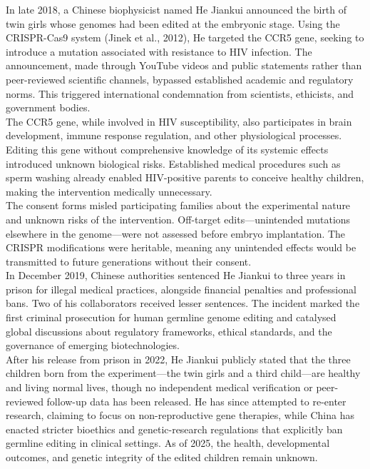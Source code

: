 \newpage
\vspace*{\fill}

\begin{shadedstory}

In late 2018, a Chinese biophysicist named He Jiankui announced the birth of twin girls whose genomes had been edited at the embryonic stage. Using the CRISPR-Cas9 system (Jinek et al., 2012), He targeted the CCR5 gene, seeking to introduce a mutation associated with resistance to HIV infection. The announcement, made through YouTube videos and public statements rather than peer-reviewed scientific channels, bypassed established academic and regulatory norms. This triggered international condemnation from scientists, ethicists, and government bodies.\\

The CCR5 gene, while involved in HIV susceptibility, also participates in brain development, immune response regulation, and other physiological processes. Editing this gene without comprehensive knowledge of its systemic effects introduced unknown biological risks. Established medical procedures such as sperm washing already enabled HIV-positive parents to conceive healthy children, making the intervention medically unnecessary.\\

 The consent forms misled participating families about the experimental nature and unknown risks of the intervention. Off-target edits—unintended mutations elsewhere in the genome—were not assessed before embryo implantation. The CRISPR modifications were heritable, meaning any unintended effects would be transmitted to future generations without their consent.\\

In December 2019, Chinese authorities sentenced He Jiankui to three years in prison for \QSOpen{}illegal medical practices,\QSClose{} alongside financial penalties and professional bans. Two of his collaborators received lesser sentences. The incident marked the first criminal prosecution for human germline genome editing and catalysed global discussions about regulatory frameworks, ethical standards, and the governance of emerging biotechnologies.\\

After his release from prison in 2022, He Jiankui publicly stated that the three children born from the experiment—the twin girls and a third child—are \QENOpen{}healthy and living normal lives,\QENClose{} though no independent medical verification or peer-reviewed follow-up data has been released. He has since attempted to re-enter research, claiming to focus on non-reproductive gene therapies, while China has enacted stricter bioethics and genetic-research regulations that explicitly ban germline editing in clinical settings. As of 2025, the health, developmental outcomes, and genetic integrity of the edited children remain unknown.\\

\end{shadedstory}
\vspace*{\fill}
